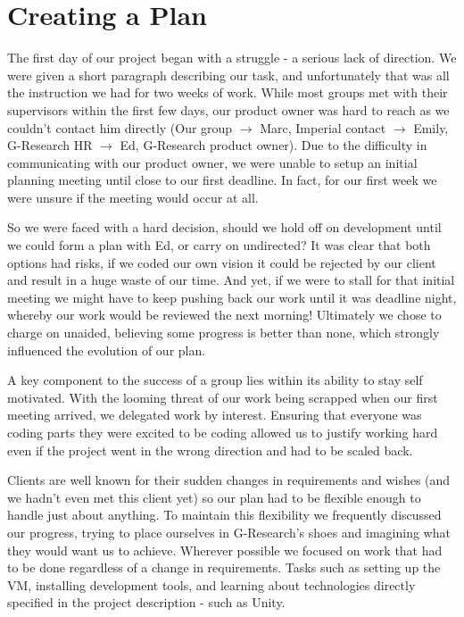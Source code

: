 \section{Creating a Plan}
The first day of our project began with a struggle - a serious lack of direction. We were given a short paragraph describing our task, and unfortunately that was all the instruction we had for two weeks of work. While most groups met with their supervisors within the first few days, our product owner was hard to reach as we couldn't contact him directly (Our group $\rightarrow$ Marc, Imperial contact $\rightarrow$ Emily, G-Research HR $\rightarrow$ Ed, G-Research product owner). Due to the difficulty in communicating with our product owner, we were unable to setup an initial planning meeting until close to our first deadline.  In fact, for our first week we were unsure if the meeting would occur at all.

So we were faced with a hard decision, should we hold off on development until we could form a plan with Ed, or carry on undirected? It was clear that both options had risks, if we coded our own vision it could be rejected by our client and result in a huge waste of our time. And yet, if we were to stall for that initial meeting we might have to keep pushing back our work until it was deadline night, whereby our work would be reviewed the next morning! Ultimately we chose to charge on unaided, believing some progress is better than none, which strongly influenced the evolution of our plan. 

A key component to the success of a group lies within its ability to stay self motivated. With the looming threat of our work being scrapped when our first meeting arrived, we delegated work by interest. Ensuring that everyone was coding parts they were excited to be coding allowed us to justify working hard even if the project went in the wrong direction and had to be scaled back.

Clients are well known for their sudden changes in requirements and wishes (and we hadn't even met this client yet) so our plan had to be flexible enough to handle just about anything. To maintain this flexibility we frequently discussed our progress, trying to place ourselves in G-Research's shoes and imagining what they would want us to achieve. Wherever possible we focused on work that had to be done regardless of a change in requirements. Tasks such as setting up the VM, installing development tools, and learning about technologies directly specified in the project description - such as Unity.

